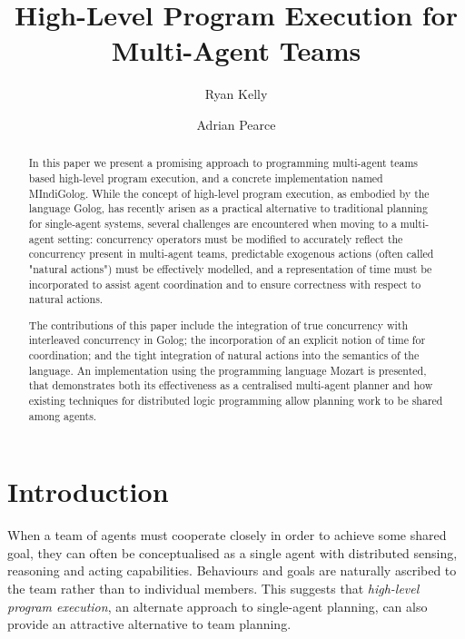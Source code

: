 \documentclass{llncs}
\begin{document}
\title{High-Level Program Execution for Multi-Agent Teams}

\author{Ryan Kelly \and Adrian Pearce}


\maketitle

\begin{abstract}
In this paper we present a promising approach to programming multi-agent
teams based high-level program execution, and a concrete implementation
named MIndiGolog. While the concept of high-level program execution,
as embodied by the language Golog, has recently arisen as a practical
alternative to traditional planning for single-agent systems, several
challenges are encountered when moving to a multi-agent setting: concurrency
operators must be modified to accurately reflect the concurrency present
in multi-agent teams, predictable exogenous actions (often called
"natural actions") must be effectively modelled, and a representation
of time must be incorporated to assist agent coordination and to ensure
correctness with respect to natural actions. 

The contributions of this paper include the integration of true concurrency
with interleaved concurrency in Golog; the incorporation of an explicit
notion of time for coordination; and the tight integration of natural
actions into the semantics of the language. An implementation using
the programming language Mozart is presented, that demonstrates both
its effectiveness as a centralised multi-agent planner and how existing
techniques for distributed logic programming allow planning work to
be shared among agents.
\end{abstract}

\section{Introduction}

When a team of agents must cooperate closely in order to achieve some
shared goal, they can often be conceptualised as a single agent with
distributed sensing, reasoning and acting capabilities. Behaviours
and goals are naturally ascribed to the team rather than to individual
members. This suggests that \emph{high-level program execution}, an
alternate approach to single-agent planning, can also provide an attractive
alternative to team planning.
\end{document}
